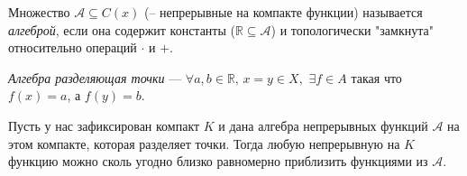 
\begin{to_def}
    Множество $\mathcal{A} \subseteq C(x)$ (-- непрерывные на компакте функции) называется \textit{алгеброй}, если она содержит константы ($\mathbb{R} \subseteq \mathcal{A}$) и топологически "замкнута" относительно операций $\cdot$ и 
    $+$.
\end{to_def}

\begin{to_def}
    \textit{Алгебра разделяющая точки} --- $\forall a, b \in \mathbb{R},\, x=y \in X,\, \, \exists f \in A$ такая что $f(x)=a$, а $f(y) = b$.
\end{to_def}

\begin{to_thr}
    Пусть у нас зафиксирован компакт $K$ и дана алгебра непрерывных функций $\mathcal A$ на этом компакте, которая разделяет точки. Тогда любую непрерывную на $K$ функцию можно сколь угодно близко равномерно приблизить функциями из $\mathcal A$. 
\end{to_thr}